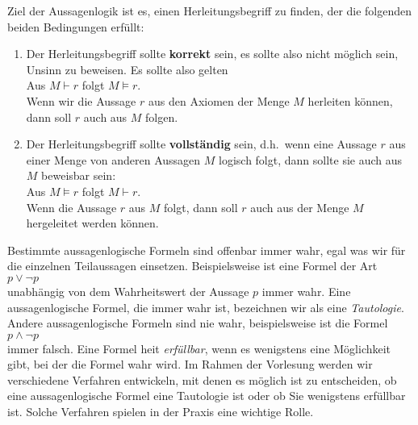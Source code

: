 Ziel der Aussagenlogik ist es, einen
Herleitungsbegriff zu finden, der die folgenden beiden Bedingungen erf\"{u}llt:
\begin{enumerate}
\item Der Herleitungsbegriff sollte {\bf korrekt} sein, es sollte also nicht m\"{o}glich sein,
      Unsinn zu beweisen.  Es sollte also gelten \\[0.2cm]
      \hspace*{1.3cm} Aus $M \vdash r$ folgt $M \models r$. 
      \\[0.2cm]
      Wenn wir die Aussage $r$ aus den Axiomen der Menge $M$ herleiten k\"{o}nnen, dann 
      soll $r$ auch aus $M$ folgen.
\item Der Herleitungsbegriff sollte {\bf vollst\"{a}ndig} sein, d.h.~wenn eine Aussage $r$
      aus einer Menge von anderen Aussagen $M$ logisch folgt, dann sollte sie
      auch aus $M$ beweisbar sein: \\[0.2cm]
      \hspace*{1.3cm} Aus $M \models r$ folgt $M \vdash r$. 
      \\[0.2cm]
      Wenn die Aussage $r$ aus $M$ folgt, dann soll $r$ auch aus der Menge $M$
      hergeleitet werden k\"{o}nnen.
\end{enumerate}

Bestimmte aussagenlogische Formeln sind offenbar immer wahr, egal was
 wir f\"{u}r die einzelnen Teilaussagen einsetzen.  Beispielsweise ist eine Formel der Art
\\[0.2cm]
\hspace*{1.3cm}
$p \vee \neg p$
\\[0.2cm]
unabh\"{a}ngig von dem Wahrheitswert der Aussage $p$ immer wahr.  Eine aussagenlogische
Formel, die immer wahr ist, bezeichnen wir als eine \emph{Tautologie}.  Andere
aussagenlogische Formeln sind nie wahr, beispielsweise ist die Formel
\\[0.2cm]
\hspace*{1.3cm}
$p \wedge \neg p$
\\[0.2cm]
immer falsch.  Eine Formel hei\3t \emph{erf\"{u}llbar}, wenn es wenigstens eine M\"{o}glichkeit
gibt, bei der die Formel wahr wird.  Im Rahmen der Vorlesung werden wir verschiedene Verfahren
entwickeln, mit denen es m\"{o}glich ist zu entscheiden, ob eine aussagenlogische Formel eine
Tautologie ist oder ob Sie wenigstens erf\"{u}llbar ist.  Solche Verfahren spielen
in der Praxis eine wichtige Rolle.

